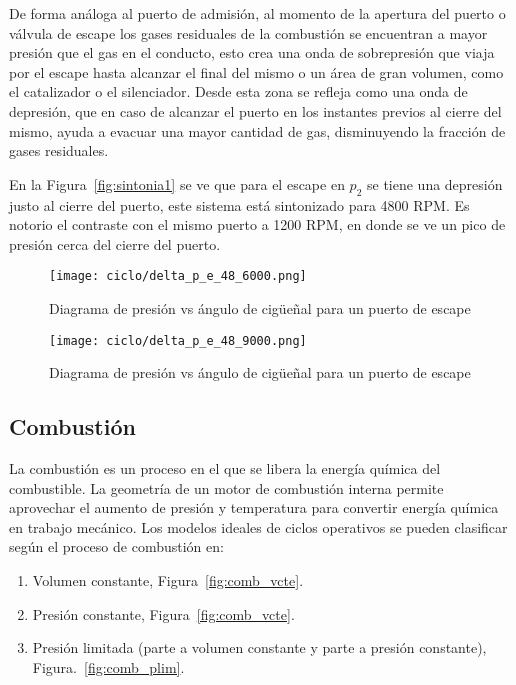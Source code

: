 De forma análoga al puerto de admisión, al momento de la apertura del puerto o
válvula de escape los gases residuales de la combustión se encuentran a  mayor
presión que el gas en el conducto, esto crea una onda de sobrepresión que viaja
por el escape hasta alcanzar el final del mismo o un área de gran volumen, como
el catalizador o el silenciador.
%
Desde esta zona se refleja como una onda de depresión, que en caso de alcanzar
el puerto en los instantes previos al cierre del mismo, ayuda a evacuar una
mayor cantidad de gas, disminuyendo la fracción de gases residuales.

En la Figura~\ref{fig:sintonia1} se ve que para el escape en $p_2$ se tiene una
depresión justo al cierre del puerto, este sistema está sintonizado para 4800
RPM.
%
Es notorio el contraste con el mismo puerto a 1200 RPM, en donde se ve un pico de
presión cerca del cierre del puerto.
%
\begin{figure} \centering
\texttt{[image: ciclo/delta\_p\_e\_48\_6000.png]}
    \caption{Diagrama de presión vs ángulo de cigüeñal para un puerto de escape}\label{fig:sintonia_esc}
\end{figure}
%
\begin{figure} \centering
\texttt{[image: ciclo/delta\_p\_e\_48\_9000.png]}
    \caption{Diagrama de presión vs ángulo de cigüeñal para un puerto de escape}\label{fig:no_sintonia_esc}
\end{figure}


\subsection{Combustión}
%
La combustión es un proceso en el que se libera la energía química del
combustible.
%
La geometría de un motor de combustión interna permite aprovechar
el aumento de presión y temperatura para convertir energía química en trabajo
mecánico.
%
Los modelos ideales de ciclos operativos se pueden clasificar según el proceso
de combustión en:
%
\begin{enumerate}
    \item Volumen constante, Figura~\ref{fig:comb_vcte}.
    \item Presión constante, Figura~\ref{fig:comb_vcte}.
    \item Presión limitada (parte a volumen constante y parte a presión
constante), Figura.~\ref{fig:comb_plim}.
\end{enumerate}

